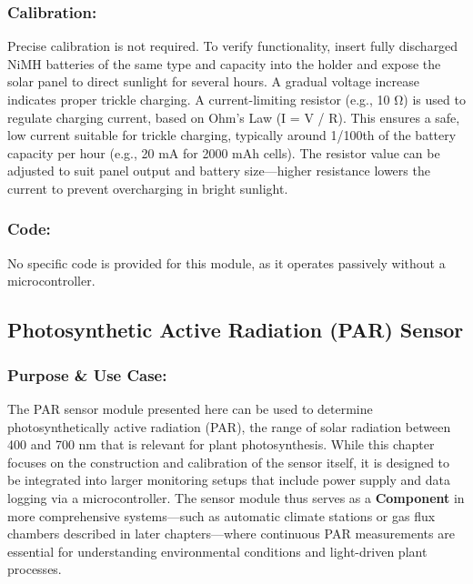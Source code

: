 \documentclass[
  11pt,
  letterpaper,
]{book}
\begin{document}
\subsubsection{Calibration:}\label{sec-solar-charger-calibration}

Precise calibration is not required. To verify functionality, insert
fully discharged NiMH batteries of the same type and capacity into the
holder and expose the solar panel to direct sunlight for several hours.
A gradual voltage increase indicates proper trickle charging. A
current-limiting resistor (e.g., 10 Ω) is used to regulate charging
current, based on Ohm's Law (I = V / R). This ensures a safe, low
current suitable for trickle charging, typically around 1/100th of the
battery capacity per hour (e.g., 20 mA for 2000 mAh cells). The resistor
value can be adjusted to suit panel output and battery size---higher
resistance lowers the current to prevent overcharging in bright
sunlight.

\subsubsection{Code:}\label{sec-solar-charger-code}

No specific code is provided for this module, as it operates passively
without a microcontroller.

\subsection{Photosynthetic Active Radiation (PAR)
Sensor}\label{sec-par-sensor}

\subsubsection{Purpose \& Use Case:}\label{sec-par-sensor-purpose}

The PAR sensor module presented here can be used to determine
photosynthetically active radiation (PAR), the range of solar radiation
between 400 and 700 nm that is relevant for plant photosynthesis. While
this chapter focuses on the construction and calibration of the sensor
itself, it is designed to be integrated into larger monitoring setups
that include power supply and data logging via a microcontroller. The
sensor module thus serves as a \textbf{Component} in more comprehensive
systems---such as automatic climate stations or gas flux chambers
described in later chapters---where continuous PAR measurements are
essential for understanding environmental conditions and light-driven
plant processes.
\end{document}
